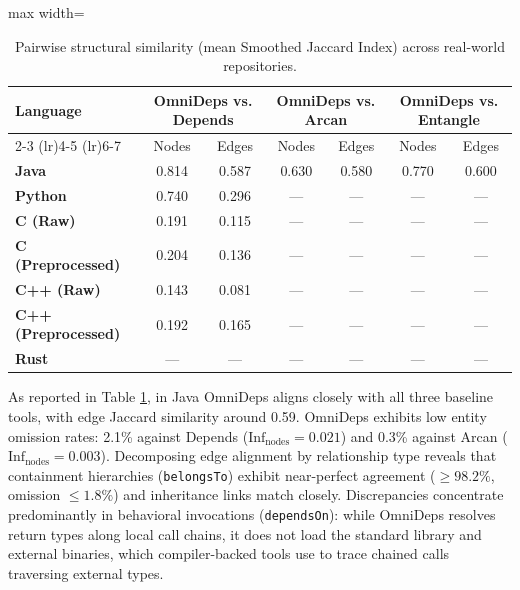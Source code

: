 \documentclass[a4paper, 11pt]{article}
\begin{document}
\begin{table}[htpb]
  \centering
  \small
  \caption{Pairwise structural similarity (mean Smoothed Jaccard
  Index) across real-world repositories.}
  \label{tab:results_summary}
  \vspace{0.4em}
  \begin{adjustbox}{max width=\textwidth}
    \begin{tabular}{lcccccc}
      \toprule
      \textbf{Language} & \multicolumn{2}{c}{\textbf{OmniDeps vs.
      Depends}} & \multicolumn{2}{c}{\textbf{OmniDeps vs. Arcan}} &
      \multicolumn{2}{c}{\textbf{OmniDeps vs. Entangle}} \\
      \cmidrule(lr){2-3} \cmidrule(lr){4-5} \cmidrule(lr){6-7}
      & Nodes & Edges & Nodes & Edges & Nodes & Edges \\
      \midrule
      \textbf{Java}             & 0.814 & 0.587 & 0.630 & 0.580 &
      0.770 & 0.600 \\
      \textbf{Python}           & 0.740 & 0.296 & ---   & ---   & ---
      & ---   \\
      \textbf{C (Raw)}          & 0.191 & 0.115 & ---   & ---   & ---
      & ---   \\
      \textbf{C (Preprocessed)} & 0.204 & 0.136 & ---   & ---   & ---
      & ---   \\
      \textbf{C++ (Raw)}        & 0.143 & 0.081 & ---   & ---   & ---
      & ---   \\
      \textbf{C++ (Preprocessed)} & 0.192 & 0.165 & --- & ---   & ---
      & ---   \\
      \textbf{Rust}             & ---   & ---   & ---   & ---   & ---
      & ---   \\
      \bottomrule
    \end{tabular}
  \end{adjustbox}
\end{table}

As reported in Table \ref{tab:results_summary}, in Java OmniDeps
aligns closely with all three baseline tools, with edge Jaccard
similarity around 0.59. OmniDeps exhibits low
entity omission rates: 2.1\% against Depends
($\text{Inf}_{\text{nodes}} = 0.021$) and 0.3\% against Arcan
($\text{Inf}_{\text{nodes}} = 0.003$).
Decomposing edge alignment by relationship type reveals that containment
hierarchies (\texttt{belongsTo}) exhibit near-perfect agreement
($\ge 98.2\%$, omission $\le 1.8\%$) and inheritance links match closely.
Discrepancies concentrate predominantly in behavioral invocations
(\texttt{dependsOn}): while OmniDeps resolves return types along local
call chains, it does not load the standard library and
external binaries, which compiler-backed tools use to trace chained calls
traversing external types.
\end{document}
